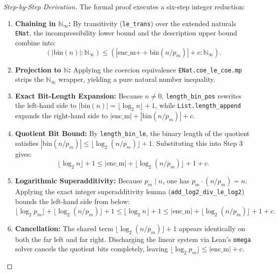 \documentclass[acmsmall,natbib=false,nonacm]{acmart}
\begin{document}
\begin{proof}[Step-by-Step Derivation]
The formal proof executes a six-step integer reduction:
\begin{enumerate}
    \item \textbf{Chaining in $\mathbb{N}_\infty$:} By transitivity (\texttt{le\_trans}) over the extended naturals \texttt{ENat}, the incompressibility lower bound and the description upper bound combine into:
    \begin{equation*}
        (|\text{bin}(n)| : \mathbb{N}_\infty) \le (|\text{enc\_m} \mathbin{+\!+} \text{bin}(n / p_m)| + c : \mathbb{N}_\infty).
    \end{equation*}
    \item \textbf{Projection to $\mathbb{N}$:} Applying the coercion equivalence \texttt{ENat.coe\_le\_coe.mp} strips the $\mathbb{N}_\infty$ wrapper, yielding a pure natural number inequality.
    \item \textbf{Exact Bit-Length Expansion:} Because $n \neq 0$, \texttt{length\_bin\_pos} rewrites the left-hand side to $|\text{bin}(n)| = \lfloor\log_2 n\rfloor + 1$, while \texttt{List.length\_append} expands the right-hand side to $|\text{enc\_m}| + |\text{bin}(n / p_m)| + c$.
    \item \textbf{Quotient Bit Bound:} By \texttt{length\_bin\_le}, the binary length of the quotient satisfies $|\text{bin}(n / p_m)| \le \lfloor\log_2(n / p_m)\rfloor + 1$. Substituting this into Step 3 gives:
    \begin{equation*}
        \lfloor\log_2 n\rfloor + 1 \le |\text{enc\_m}| + \lfloor\log_2(n / p_m)\rfloor + 1 + c.
    \end{equation*}
    \item \textbf{Logarithmic Superadditivity:} Because $p_m \mid n$, one has $p_m \cdot (n / p_m) = n$. Applying the exact integer superadditivity lemma (\texttt{add\_log2\_div\_le\_log2}) bounds the left-hand side from below:
    \begin{equation*}
        \lfloor\log_2 p_m\rfloor + \lfloor\log_2(n / p_m)\rfloor + 1 \le \lfloor\log_2 n\rfloor + 1 \le |\text{enc\_m}| + \lfloor\log_2(n / p_m)\rfloor + 1 + c.
    \end{equation*}
    \item \textbf{Cancellation:} The shared term $\lfloor\log_2(n / p_m)\rfloor + 1$ appears identically on both the far left and far right. Discharging the linear system via Lean's \texttt{omega} solver cancels the quotient bits completely, leaving $\lfloor\log_2 p_m\rfloor \le |\text{enc\_m}| + c$.
\end{enumerate}
\end{proof}
\end{document}
